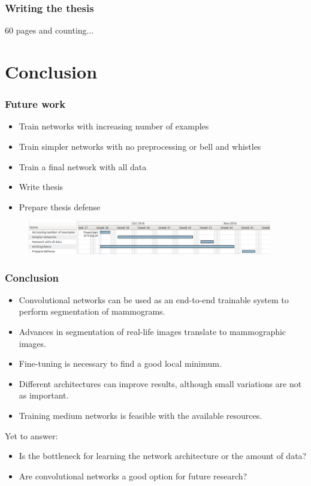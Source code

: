\documentclass{beamer}
\begin{document}
	\begin{frame}
		\frametitle{Writing the thesis}
		60 pages and counting...
	\end{frame}
	
	
	\section[Conclusion]{Conclusion}
	\begin{frame}
		\frametitle{Future work}
		\begin{itemize}
			\item Train networks with increasing number of examples
			\item Train simpler networks with no preprocessing or bell and whistles
			\item Train a final network with all data
			\item Write thesis
			\item Prepare thesis defense
		\end{itemize}
		\begin{figure}
			\includegraphics[width=0.95\textwidth]{plots/workplan.png}
		\end{figure}
	\end{frame}
	
	\begin{frame}
		\frametitle{Conclusion}
		\begin{itemize}
			\item Convolutional networks can be used as an end-to-end trainable system to perform segmentation of mammograms.
			\item Advances in segmentation of real-life images translate to mammographic images. 
			\item Fine-tuning is necessary to find a good local minimum.
			\item Different architectures can improve results, although small variations are not as important.
			\item Training medium networks is feasible with the available resources.
		\end{itemize}
		Yet to answer:
		\begin{itemize}
			\item Is the bottleneck for learning the network architecture or the amount of data?
			\item Are convolutional networks a good option for future research?
		\end{itemize}
	\end{frame}
\end{document}
